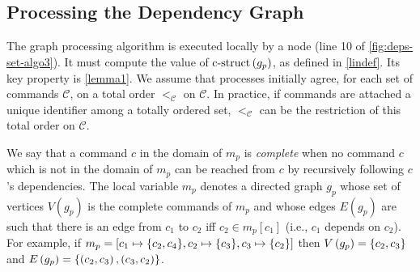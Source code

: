 \subsection{Processing the Dependency Graph}
\label{abstract-algo}

\begin{comment}
Local variables: $m_p$, a map from commands to dependency sets, initially the empty map; $\sigma_p$, a c-struct, initially $\bot$.
\begin{itemize}[noitemsep,nolistsep]
    \item Upon ${\opn{propose}\left( c \right)}^p$: call ${\opn{announce}\left( c \right)}^p$.
    \item Upon ${\opn{suggest}\left( c,d \right)}^p$: call ${\opn{propose}\left( c,d \right)}^p$.
    \item Upon ${\opn{decide}\left( c,d \right)}^p$: insert the mapping $c \rightarrow d$ in the map $m_p$.
    \item Periodically, update $\sigma_p$ to $\opn{c-struct}\left( m_p \right)$, where $\opn{c-struct}\left( m_p \right)$ is defined below.
\end{itemize}

\end{comment}

The graph processing algorithm is executed locally by a node (line 10 of \cref{fig:deps-set-algo3}). It must compute the value of $\operatorname{c-struct}\left( g_p \right)$, as defined in \cref{lindef}.
Its key property is \cref{lemma1}. 
We assume that processes initially agree, for each set of commands $\mathcal{C}$, on a total order $<_{\mathcal{C}}$ on $\mathcal{C}$.
In practice, if commands are attached a unique identifier among a totally ordered set, $<_{\mathcal{C}}$ can be the restriction of this total order on $\mathcal{C}$.

We say that a command $c$ in the domain of $m_p$ is \emph{complete} when no command $c$ which is not in the domain of $m_p$ can be reached from $c$ by recursively following $c$'s dependencies.
The local variable $m_p$ denotes a directed graph $g_p$ whose set of vertices $V\left( g_p \right)$ is the complete commands of $m_p$ and whose edges $E\left( g_p \right)$ are such that there is an edge from $c_1$ to $c_2$ iff $c_2 \in m_p\left[ c_1 \right]$ (i.e., $c_1$ depends on $c_2$). For example, if $m_p = \left[ c_1 \mapsto \aset{c_2,c_4}, c_2 \mapsto \aset{c_3}, c_3 \mapsto \aset{c_2}\right]$ then $V\left( g_p \right) = \left\{c_2,c_3\right\}$ and $E\left( g_p \right) = \left\{\left( c_2,c_3 \right),\left( c_3,c_2 \right)\right\}$.

